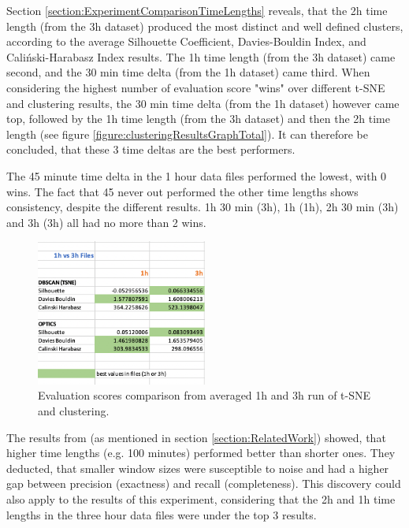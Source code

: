 
Section \ref{section:ExperimentComparisonTimeLengths} reveals, that the 2h time length (from the 3h dataset) produced the most distinct and well defined clusters, according to the average Silhouette Coefficient, Davies-Bouldin Index, and Caliński-Harabasz Index results. The 1h time length (from the 3h dataset) came second, and the 30 min time delta (from the 1h dataset) came third. When considering the highest number of evaluation score "wins" over different t-SNE and clustering results, the 30 min time delta (from the 1h dataset) however came top, followed by the 1h time length (from the 3h dataset) and then the 2h time length (see figure \ref{figure:clusteringResultsGraphTotal}). It can therefore be concluded, that these 3 time deltas are the best performers.

The 45 minute time delta in the 1 hour data files performed the lowest, with 0 wins. The fact that 45 never out performed the other time lengths shows consistency, despite the different results. 1h 30 min (3h), 1h (1h), 2h 30 min (3h) and 3h (3h) all had no more than 2 wins. 


\begin{figure}
  \centering
  \includegraphics[width=0.5\textwidth]{./images/clusteringResults/clusteringResults7.png}
  \caption{Evaluation scores comparison from averaged 1h and 3h run of t-SNE and clustering.}
  \label{figure:clusteringResults7}
\end{figure}


The results from \textcite{AboutToEat2016Rahman} (as mentioned in section \ref{section:RelatedWork}) showed, that higher time lengths (e.g. 100 minutes) performed better than shorter ones. They deducted, that smaller window sizes were susceptible to noise and had a higher gap between precision (exactness) and recall (completeness). 
This discovery could also apply to the results of this experiment, considering that the 2h and 1h time lengths in the three hour data files were under the top 3 results.


